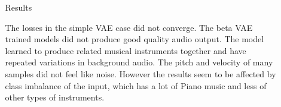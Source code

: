 \documentclass[final]{beamer}
\newlength{\sepwid}
\newlength{\onecolwid}
\newlength{\twocolwid}
\begin{document}
\begin{frame}[t]
\begin{columns}[t]
\begin{column}{\twocolwid}
\begin{columns}[t,totalwidth=\twocolwid]
\begin{column}{\onecolwid}




\end{column} %

\begin{column}{\onecolwid} %



\end{column} %

\end{columns} %

\end{column} %

\begin{column}{\sepwid}\end{column} %

\begin{column}{\onecolwid} %


\begin{block}{Results}

The losses in the simple VAE case did not converge. The beta VAE trained models did not produce good quality audio output. The model learned to produce related musical instruments together and have repeated variations in background audio. The pitch and velocity of many samples did not feel like noise. However the results seem to be affected by class imbalance of the input, which has a lot of Piano music and less of other types of instruments.


\end{block}
\end{column}
\end{columns}
\end{frame}
\end{document}
